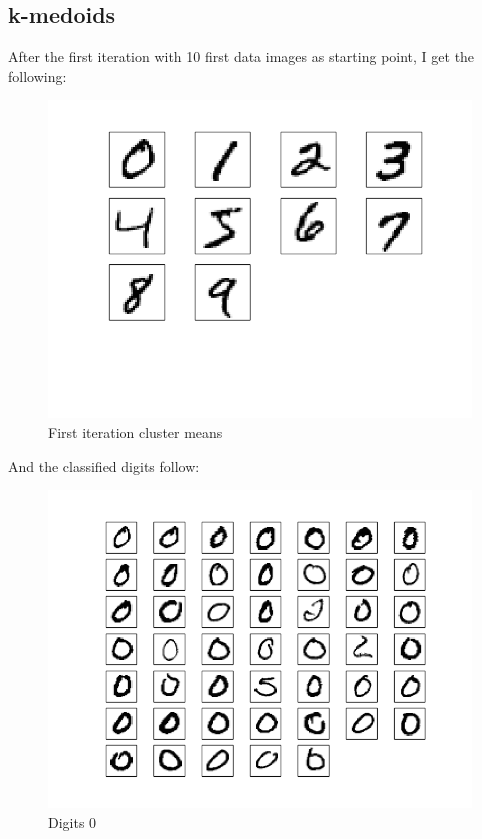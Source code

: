 \documentclass[10pt]{article}
\begin{document}
\subsection{k-medoids}
After the first iteration with 10 first data images as starting point, I get the following:
\begin{figure}
\begin{center}
\includegraphics[scale=0.5]{medoidsA}
\caption{First iteration cluster means}
\end{center}
\end{figure}
And the classified digits follow:
\begin{figure}
\begin{center}
\includegraphics[scale=0.5]{medoidsA0}
\caption{Digits 0}
\end{center}
\end{figure}
\end{document}
